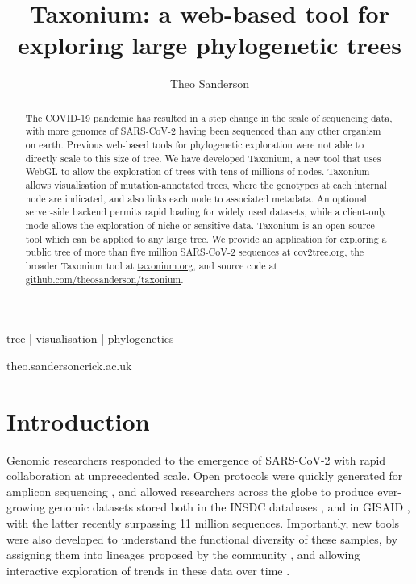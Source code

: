 
\title{Taxonium: a web-based tool for exploring large phylogenetic trees}

\author[1]{Theo Sanderson }

\date{}

\maketitle

\begin{abstract}
The COVID-19 pandemic has resulted in a step change in the scale of sequencing data, with more genomes of SARS-CoV-2 having been sequenced than any other organism on earth. Previous web-based tools for phylogenetic exploration were not able to directly scale to this size of tree. We have developed Taxonium, a new tool that uses WebGL to allow the exploration of trees with tens of millions of nodes. Taxonium allows visualisation of mutation-annotated trees, where the genotypes at each internal node are indicated, and also links each node to associated metadata. An optional server-side backend permits rapid loading for widely used datasets, while a client-only mode allows the exploration of niche or sensitive data. Taxonium is an open-source tool which can be applied to any large tree. We provide an application for exploring a public tree of more than five million SARS-CoV-2 sequences at \href{http://cov2tree.org}{cov2tree.org}, the broader Taxonium tool at \href{http://taxonium.org}{taxonium.org}, and source code at \href{https://github.com/theosanderson/taxonium}{github.com/theosanderson/taxonium}.


\end{abstract}

\begin{keywords}
tree | visualisation | phylogenetics
\end{keywords}

\begin{corrauthor}
theo.sanderson\at crick.ac.uk
\end{corrauthor}

\section*{Introduction}\label{s:introduction}

Genomic researchers responded to the emergence of SARS-CoV-2 with rapid collaboration at unprecedented scale. Open protocols were quickly generated for amplicon sequencing \citep{Tyson2020}, and allowed researchers across the globe to produce ever-growing genomic datasets stored both in the INSDC databases \citep{insdc}, and in GISAID \citep{shu2017gisaid}, with the latter recently surpassing 11 million sequences. Importantly, new tools were also developed to understand the functional diversity of these samples, by assigning them into lineages proposed by the community \citep{rambaut2020dynamic, o2021assignment}, and allowing interactive exploration of trends in these data over time \citep{hodcroft_2021, chen2022cov, outbreakinfo}.

